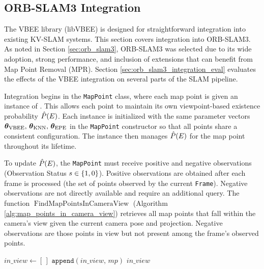 \subsection{ORB-SLAM3 Integration}
\label{sec:orb_slam3_integration}

The VBEE library (libVBEE) is designed for straightforward integration into existing KV-SLAM systems. This section covers integration into ORB-SLAM3. As noted in Section \ref{sec:orb_slam3}, ORB-SLAM3 was selected due to its wide adoption, strong performance, and inclusion of extensions that can benefit from Map Point Removal (MPR). Section \ref{sec:orb_slam3_integration_eval} evaluates the effects of the VBEE integration on several parts of the SLAM pipeline.

Integration begins in the \texttt{MapPoint} class, where each map point is given an instance of \vbee. This allows each point to maintain its own viewpoint-based existence probability \(\hat{P}(E)\). Each \vbee{} instance is initialized with the same parameter vectors \(\boldsymbol{\theta}_{\text{VBEE}},\,\boldsymbol{\theta}_{\text{KNN}},\,\boldsymbol{\theta}_{\text{EPE}}\) in the \texttt{MapPoint} constructor so that all points share a consistent configuration. The \vbee{} instance then manages \(\hat{P}(E)\) for the map point throughout its lifetime.

To update \(\hat{P}(E)\), the \texttt{MapPoint} must receive positive and negative observations (Observation Status \(s \in \{1,0\}\)). Positive observations are obtained after each frame is processed (the set of points observed by the current \texttt{Frame}). Negative observations are not directly available and require an additional query. The function \(\operatorname{FindMapPointsInCameraView}\) (Algorithm \ref{alg:map_points_in_camera_view}) retrieves all map points that fall within the camera’s view given the current camera pose and projection. Negative observations are those points in view but not present among the frame’s observed points.

\begin{singlespace}
\begin{algorithm}[H]
    \caption[Find Map Points in Camera View]{$\operatorname{FindMapPointsInCameraView}$}
    \label{alg:map_points_in_camera_view}
    \begin{algorithmic}
            \State $in\_view \gets [\,]$
                    \State $\texttt{append}(in\_view,\, mp)$
                \EndIf
            \EndFor
            \State \Return $in\_view$
        \EndFunction
    \end{algorithmic}
\end{algorithm}
\end{singlespace}

